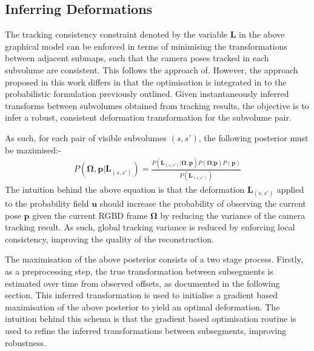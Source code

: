 \subsection{Inferring Deformations}
The tracking consistency constraint denoted by the variable $\mathbf{L}$ in the above graphical model can be enforced in terms of minimising the 
transformations between adjacent submaps, such that the camera poses tracked in each subvolume are consistent. This follows the approach 
of\cite{Kahler2016}.  However, the approach proposed in this work differs in that the optimisation is integrated in to the probabilistic 
formulation previously outlined. Given instantaneously inferred transforms between subvolumes obtained from tracking results, 
the objective is to infer a robust, consistent deformation transformation for the subvolume pair.

As such, for each pair of visible subvolumes $(s, s')$, the following posterior must be maximised:-
\begin{equation}
\begin{split}
P(\mathbf{\Omega}, \mathbf{p} | \mathbf{L}_{(s, s')}) = \frac{P(\mathbf{L}_{(s, s')} | \mathbf{\Omega}, \mathbf{p}) P(\mathbf{\Omega} | \mathbf{p})P(\mathbf{p})}
{P(\mathbf{L}_{(s, s')})}
\end{split}
\end{equation}
The intuition behind the above equation is that the deformation $\mathbf{L}_{(s, s')}$ applied to the probability field $\mathbf{u}$ should 
increase the probability of observing the current pose $\mathbf{p}$ given the current RGBD frame $\mathbf{\Omega}$ by reducing the 
variance of the camera tracking result. As such, global tracking variance is reduced by enforcing local consistency, improving the quality 
of the reconstruction.

The maximisation of the above posterior consists of a two stage process. Firstly, as a preprocessing step, the true transformation between 
subsegments is estimated over time from observed offsets, as documented in the following section. This inferred transformation is used to 
initialise a gradient based maximisation of the above posterior to yield an optimal deformation. The intuition behind this schema is that the 
gradient based optimisation routine is used to refine the inferred transformations between subsegments, improving robustness.

